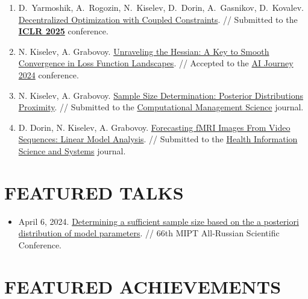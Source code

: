 \documentclass[11pt,a4paper]{moderncv}
\begin{document}
\begin{minipage}[t]{0.62\textwidth}
\begin{enumerate}
    \item D.~Yarmoshik, A.~Rogozin, N.~Kiselev, D.~Dorin, A.~Gasnikov, D.~Kovalev. \href{https://arxiv.org/abs/2407.02020}{Decentralized Optimization with Coupled Constraints}. // Submitted to the \href{https://neurips.cc}{\textbf{ICLR 2025}} conference. 
    \item N. Kiselev, A. Grabovoy. \href{https://github.com/kisnikser/landscape-hessian}{Unraveling the Hessian: A Key to Smooth Convergence in Loss Function Landscapes}. // Accepted to the \href{https://aij.ru/eng}{AI Journey 2024} conference.
    \item N. Kiselev, A. Grabovoy. \href{https://github.com/kisnikser/Posterior-Distributions-Proximity}{Sample Size Determination: Posterior Distributions Proximity}. // Submitted to the \href{https://link.springer.com/journal/10287}{Computational Management Science} journal.
    \item D. Dorin, N. Kiselev, A. Grabovoy. \href{https://github.com/DorinDaniil/Forecasting-fMRI-Images}{Forecasting fMRI Images From Video Sequences: Linear Model Analysis}. // Submitted to the \href{https://link.springer.com/journal/13755}{Health Information Science and Systems} journal.
\end{enumerate}

\section{FEATURED TALKS}

\begin{itemize}
\item April 6, 2024. \href{https://www.youtube.com/live/WnIRaRl730A?si=q0eScgnDP2ZidCpK&t=1723}{Determining a sufficient sample size based on the a posteriori distribution of model parameters}. // 66th MIPT All-Russian Scientific Conference.
\end{itemize}

\section{FEATURED ACHIEVEMENTS}


\end{minipage}
\end{document}
